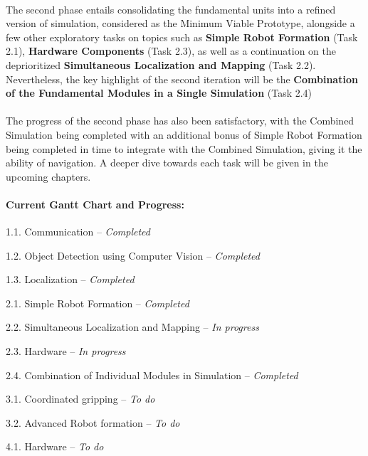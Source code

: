 \paragraph*{}
The second phase entails consolidating the fundamental units into a refined version of simulation, considered as the Minimum Viable Prototype, alongside a few other exploratory tasks on topics such as \textbf{Simple Robot Formation} (Task 2.1), \textbf{Hardware Components} (Task 2.3), as well as a continuation on the deprioritized \textbf{Simultaneous Localization and Mapping} (Task 2.2). Nevertheless, the key highlight of the second iteration will be the \textbf{Combination of the Fundamental Modules in a Single Simulation} (Task 2.4)

\paragraph*{}
The progress of the second phase has also been satisfactory, with the Combined Simulation being completed with an additional bonus of Simple Robot Formation being completed in time to integrate with the Combined Simulation, giving it the ability of navigation. A deeper dive towards each task will be given in the upcoming chapters.

\paragraph*{Current Gantt Chart and Progress:}
\begin{description}
    \item 1.1. Communication -- \textit{Completed}
    \item 1.2. Object Detection using Computer Vision -- \textit{Completed}
    \item 1.3. Localization -- \textit{Completed}
    \item 2.1. Simple Robot Formation -- \textit{Completed}
    \item 2.2. Simultaneous Localization and Mapping -- \textit{In progress}
    \item 2.3. Hardware -- \textit{In progress}
    \item 2.4. Combination of Individual Modules in Simulation -- \textit{Completed}
    \item 3.1. Coordinated gripping -- \textit{To do}
    \item 3.2. Advanced Robot formation -- \textit{To do}
    \item 4.1. Hardware -- \textit{To do}
\end{description}
